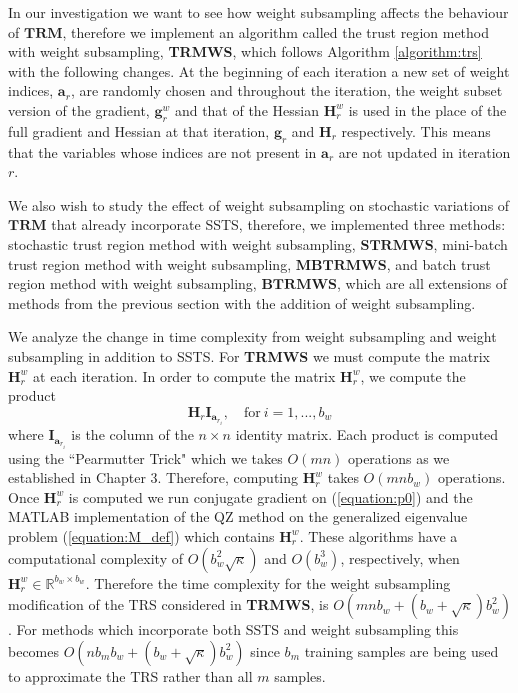 \documentclass[letterpaper,12pt,titlepage,oneside,final]{book}
\begin{document}
	In our investigation we want to see how weight subsampling affects the behaviour of $\mathbf{TRM}$, therefore we implement an algorithm called the trust region method with weight subsampling, \textbf{TRMWS}, which follows Algorithm \ref{algorithm:trs} with the following changes. At the beginning of each iteration a new set of weight indices, $\mathbf{a}_{r}$, are randomly chosen and throughout the iteration, the weight subset version of the gradient, $\mathbf{g}_{r}^{w}$ and that of the Hessian $\mathbf{H}_{r}^{w}$ is used in the place of the full gradient and Hessian at that iteration, $\mathbf{g}_{r}$ and $\mathbf{H}_{r}$ respectively. This means that the variables whose indices are not present in $\mathbf{a}_{r}$ are not updated in iteration $r$.
	
	We also wish to study the effect of weight subsampling on stochastic variations of $\mathbf{TRM}$ that already incorporate SSTS, therefore, we implemented three methods: stochastic trust region method with weight subsampling, $\mathbf{STRMWS}$, mini-batch trust region method with weight subsampling, $\mathbf{MBTRMWS}$, and batch trust region method with weight subsampling, $\mathbf{BTRMWS}$, which are all extensions of methods from the previous section with the addition of weight subsampling.
	
	We analyze the change in time complexity from weight subsampling and weight subsampling in addition to SSTS. For \textbf{TRMWS} we must compute the matrix $\mathbf{H}^{w}_{r}$ at each iteration. In order to compute the matrix $\mathbf{H}^{w}_{r}$, we compute the product 
	\begin{equation}\mathbf{H}_{r}\mathbf{I}_{\mathbf{a}_{r_{i}}}, \quad \text{for} \ i = 1,...,b_{w}
	\end{equation}
	where $\mathbf{I}_{\mathbf{a}_{r_{i}}}$ is the column of the $n \times n$ identity matrix. Each product is computed using the ``Pearmutter Trick" which we takes $O(mn)$ operations as we established in Chapter 3. Therefore, computing $\mathbf{H}^{w}_{r}$ takes $O(mnb_{w})$ operations. Once $\mathbf{H}^{w}_{r}$ is computed we run conjugate gradient on (\ref{equation:p0}) and the MATLAB implementation of the QZ method on the generalized eigenvalue problem (\ref{equation:M_def}) which contains $\mathbf{H}^{w}_{r}$. These algorithms have a computational complexity of $O(b_{w}^{2}\sqrt{\kappa})$ and $O(b_{w}^3)$, respectively, when $\mathbf{H}^{w}_{r} \in \mathbb{R}^{b_{w}\times b_{w}}$. Therefore the time complexity for the weight subsampling modification of the TRS considered in \textbf{TRMWS}, is $O(mnb_{w} + (b_{w}+\sqrt{\kappa})b_{w}^{2})$. For methods which incorporate both SSTS and weight subsampling this becomes $O(nb_{m}b_{w} + (b_{w}+\sqrt{\kappa})b_{w}^{2})$ since $b_{m}$ training samples are being used to approximate the TRS rather than all $m$ samples.
	
\end{document}
